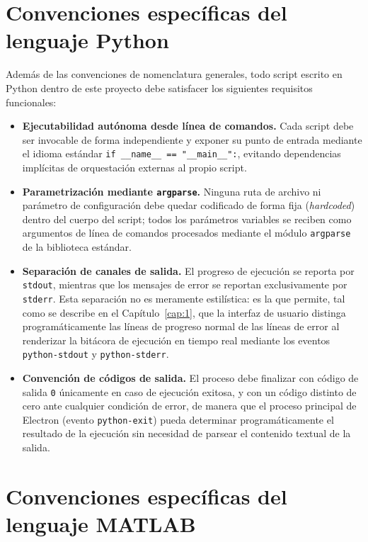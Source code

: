 \section{Convenciones espec\'ificas del lenguaje Python}

Adem\'as de las convenciones de nomenclatura generales, todo script escrito
en Python dentro de este proyecto debe satisfacer los siguientes requisitos
funcionales:

\begin{itemize}
    \item \textbf{Ejecutabilidad aut\'onoma desde l\'inea de comandos.} Cada
    script debe ser invocable de forma independiente y exponer su punto de
    entrada mediante el idioma est\'andar
    \texttt{if \_\_name\_\_ == "\_\_main\_\_":}, evitando dependencias
    impl\'icitas de orquestaci\'on externas al propio script.
    \item \textbf{Parametrizaci\'on mediante \texttt{argparse}.} Ninguna ruta
    de archivo ni par\'ametro de configuraci\'on debe quedar codificado de
    forma fija (\emph{hardcoded}) dentro del cuerpo del script; todos los
    par\'ametros variables se reciben como argumentos de l\'inea de comandos
    procesados mediante el m\'odulo \texttt{argparse} de la biblioteca
    est\'andar.
    \item \textbf{Separaci\'on de canales de salida.} El progreso de
    ejecuci\'on se reporta por \texttt{stdout}, mientras que los mensajes de
    error se reportan exclusivamente por \texttt{stderr}. Esta separaci\'on
    no es meramente estil\'istica: es la que permite, tal como se describe en
    el Cap\'itulo~\ref{cap:1}, que la interfaz de usuario distinga
    program\'aticamente las l\'ineas de progreso normal de las l\'ineas de
    error al renderizar la bit\'acora de ejecuci\'on en tiempo real mediante
    los eventos \texttt{python-stdout} y \texttt{python-stderr}.
    \item \textbf{Convenci\'on de c\'odigos de salida.} El proceso debe
    finalizar con c\'odigo de salida \texttt{0} \'unicamente en caso de
    ejecuci\'on exitosa, y con un c\'odigo distinto de cero ante cualquier
    condici\'on de error, de manera que el proceso principal de Electron
    (evento \texttt{python-exit}) pueda determinar program\'aticamente el
    resultado de la ejecuci\'on sin necesidad de parsear el contenido textual
    de la salida.
\end{itemize}

\section{Convenciones espec\'ificas del lenguaje MATLAB}

